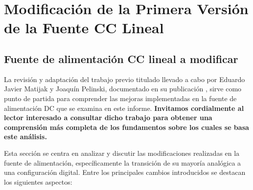 \chapter{Modificación de la Primera Versión de la Fuente CC Lineal}

\label{C:Sobre la fuente anterior}

\section{Fuente de alimentación CC lineal a modificar}
La revisión y adaptación del trabajo previo titulado  llevado a cabo por Eduardo Javier Matijak y Joaquín Pelinski, documentado en su publicación \cite{Fuente2023}, sirve como punto de partida para comprender las mejoras implementadas en la fuente de alimentación DC que se examina en este informe. \textbf{Invitamos cordialmente al lector interesado a consultar dicho trabajo para obtener una comprensión más completa de los fundamentos sobre los cuales se basa este análisis.} \par 
Esta sección se centra en analizar y discutir las modificaciones realizadas en la fuente de alimentación, específicamente la transición de su mayoría analógica a una configuración digital. Entre los principales cambios introducidos se destacan los siguientes aspectos:

